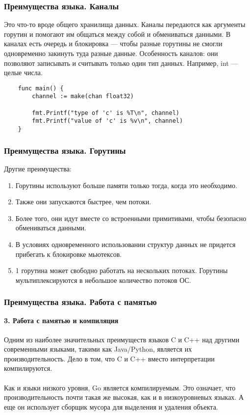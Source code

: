 \documentclass{beamer}
\begin{document}
\begin{frame}[fragile] \frametitle{Преимущества языка. Каналы}
  Это что-то вроде общего хранилища данных. Каналы передаются как аргументы
  горутин и помогают им общаться между собой и обмениваться данными. В каналах
  есть очередь и блокировка — чтобы разные горутины не смогли одновременно
  закинуть туда разные данные. Особенность каналов: они позволяют записывать и
  считывать только один тип данных. Например, int — целые числа.
  \begin{verbatim}
    func main() {
        channel := make(chan float32)
    
        fmt.Printf("type of 'c' is %T\n", channel)
        fmt.Printf("value of 'c' is %v\n", channel)
    }
  \end{verbatim}
\end{frame}
\begin{frame}[fragile] \frametitle{Преимущества языка. Горутины}
  Другие преимущества:
  \begin{enumerate}
    \item Горутины используют больше памяти только тогда, когда это необходимо.
    \item Также они запускаются быстрее, чем потоки.
    \item Более того, они идут вместе со встроенными примитивами, чтобы
    безопасно обмениваться данными.
    \item В условиях одновременного использовании структур данных не придется
    прибегать к блокировке мьютексов.
    \item 1 горутина может свободно работать на нескольких потоках. Горутины
    мультиплексируются в небольшое количество потоков ОС.
  \end{enumerate}
\end{frame}
\begin{frame}[fragile] \frametitle{Преимущества языка. Работа с памятью}
  \textbf{3. Работа с памятью и компиляция}
  \\\\
  Одним из наиболее значительных преимуществ языков C и C++ над другими
  современными языками, такими как Java/Python, является их производительность.
  Дело в том, что C и C++ вместо интерпретации компилируются.
  \\\\
  Как и языки низкого уровня, Go является компилируемым. Это означает, что
  производительность почти такая же высокая, как и в низкоуровневых языках. А
  еще он использует сборщик мусора для выделения и удаления объекта.
  
\end{frame}
\end{document}
